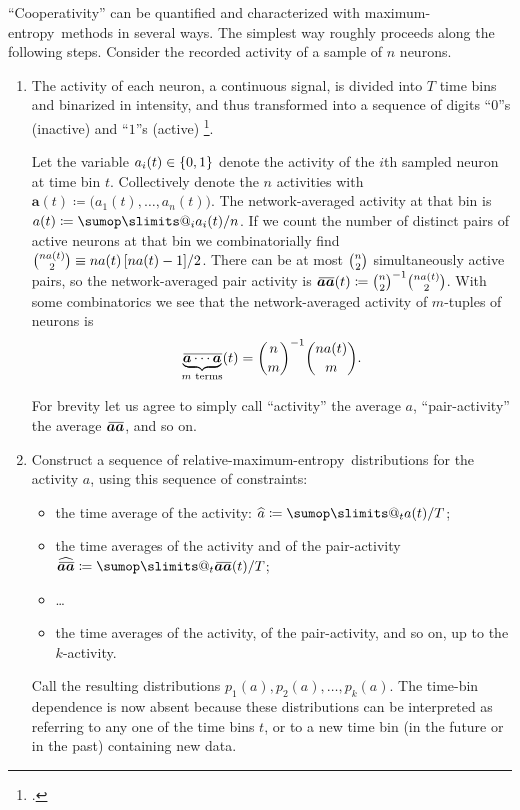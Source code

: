 \documentclass[\ifafour a4paper,12pt,\else a5paper,10pt,\fi%
onecolumn,oneside,article,%
british%
]{memoir}
\makeatletter
\theoremstyle{remark}
\theoremstyle{innote}
\def\sum{\DOTSI\sumop\slimits@}
\newcommand*{\citep}{\footcites}
\newcommand*{\defd}{\coloneqq}
\DeclarePairedDelimiter\set{\{}{\}}
\renewcommand*{\|}[1][]{\nonscript\,#1\vert\nonscript\;\mathopen{}}
\newcommand*{\cf}{{cf.}}
\newcommand*{\widebar}[1]{{\mkern1.5mu\skew{2}\overline{\mkern-1.5mu#1\mkern-1.5mu}\mkern 1.5mu}}
\newcommand*{\tav}{\widehat} %
\newcommand*{\av}{\widebar} %
\newcommand*{\yav}{a}
\newcommand*{\yaa}{\bm{\yav}}%
\newcommand*{\ya}{\yav}%
\newcommand*{\me}{maximum-entropy}
\makeatother
\begin{document}
\enquote{Cooperativity} can be quantified and characterized with \me\
methods in several ways. The simplest way roughly proceeds along the
following steps. Consider the recorded activity of a sample of $n$ neurons.
\begin{enumerate}
\item The activity of each neuron, a continuous signal, is divided into $T$
  time bins and binarized in intensity, and thus transformed into a
  sequence of digits \enquote{$0$}s (inactive) and \enquote{$1$}s (active)
  \citep[\cf][]{caianiello1961,caianiello1986}.

  Let the variable $\yav_i(t)\in\set{0,1}$ denote the activity of the $i$th
  sampled neuron at time bin $t$. Collectively denote the $n$ activities
  with $\yaa(t) \defd \bigl(\yav_1(t),\dotsc,\yav_n(t)\bigr)$. The
  network-averaged activity at that bin is
  $\ya(t) \defd \sum_i \yav_i(t)/n$. If we count the number of distinct
  pairs of active neurons at that bin we combinatorially find
  $\tbinom{n\ya(t)}{2}\equiv n\ya(t)\,[n\ya(t)-1]/2$. There can be at
  most $\tbinom{n}{2}$ simultaneously active pairs, so the
  network-averaged pair activity is
  $\av{\yaa \yaa}(t) \defd \tbinom{n}{2}^{-1}\tbinom{n\ya(t)}{2}$. With some
  combinatorics we see that the network-averaged activity of $m$-tuples
  of neurons is
  \begin{equation}
    \label{eq:products_intermsof_average}
    \av{\underbrace{\yaa\dotsm\yaa}_{\text{$m$ terms}}}(t)
    = \binom{n}{m}^{-1}\binom{n\ya(t)}{m}.
  \end{equation}
  
  For brevity let us agree to simply call \enquote{activity} the average
  $\ya$, \enquote{pair-activity} the average $\av{\yaa \yaa}$, and so on.

\item Construct a sequence of relative-\me\ distributions for the activity
  $\ya$, using this sequence of constraints:
  \begin{itemize}
  \item the time average of the activity: $\tav{\ya} \defd \sum_t\ya(t)/T$;
  \item the time averages of the activity and of the pair-activity
    $\tav{\av{\yaa \yaa}} \defd \sum_t\av{\yaa \yaa}(t)/T$;
  \item \ldots
  \item the time averages of the activity, of the pair-activity, and so on, up
    to the $k$-activity.
  \end{itemize}
  Call the resulting distributions $p_1(\ya), p_2(\ya),\dotsc,p_k(\ya)$.
  The time-bin dependence is now absent because these distributions can be
  interpreted as referring to any one of the time bins $t$, or to a new
  time bin (in the future or in the past) containing new data.


\end{enumerate}
\end{document}

